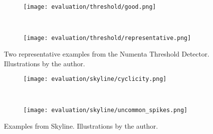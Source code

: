 \begin{figure}[htp!]
    \begin{subfigure}[b]{\linewidth}
        \centering
        \texttt{[image: evaluation/threshold/good.png]}
    \end{subfigure}%
    \\
    \begin{subfigure}[b]{\linewidth}
        \centering
        \texttt{[image: evaluation/threshold/representative.png]}
    \end{subfigure}
\caption[Examples from Numenta Threshold Detector.]{Two representative examples
from the Numenta Threshold Detector. Illustrations by the author.}\label{fig:threshold-output}
\end{figure}

\begin{figure}[htp!]
    \begin{subfigure}[b]{\linewidth}
        \centering
        \texttt{[image: evaluation/skyline/cyclicity.png]}
        \label{fig:skyline-cyclicity}
    \end{subfigure}%
    \\
    \begin{subfigure}[b]{\linewidth}
        \centering
        \texttt{[image: evaluation/skyline/uncommon\_spikes.png]}
        \label{fig:skyline-fp}
    \end{subfigure}
\caption[Examples from Skyline.]{Examples from Skyline. Illustrations by the author.}\label{fig:skyline-output}
\end{figure}

